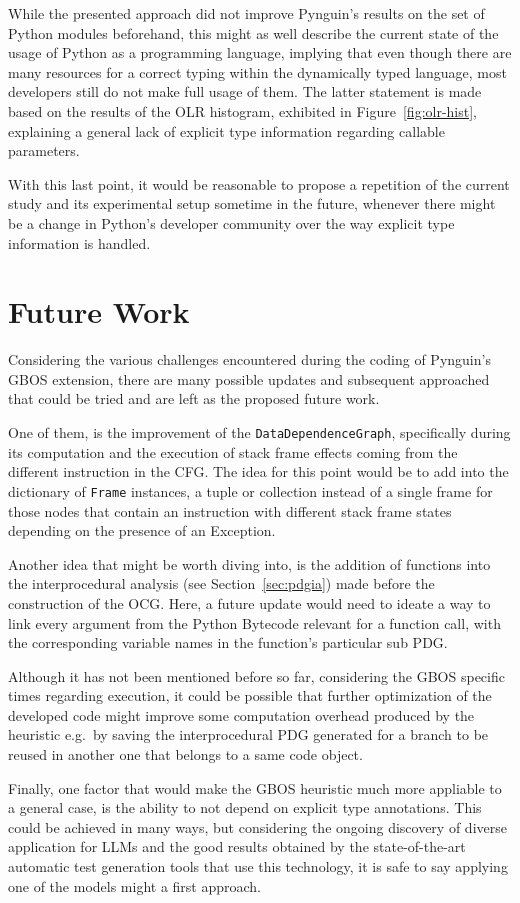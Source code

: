 \documentclass[%
  chapterprefix=false,%
  open=right,%
  twoside=true,%
  paper=a4,%
  logofile={Figures/logo.png},%
  thesistype=master,%
  UKenglish,%
]{se2thesis}
\newcommand{\classname}[1]{\texttt{#1}}
\begin{document}
While the presented approach did not improve Pynguin's results on the set of Python modules beforehand, this might as well describe the current state of the usage of Python as a programming language, implying that even though there are many resources for a correct typing within the dynamically typed language, most developers still do not make full usage of them.
The latter statement is made based on the results of the OLR histogram, exhibited in Figure~\ref{fig:olr-hist}, explaining a general lack of explicit type information regarding callable parameters.

With this last point, it would be reasonable to propose a repetition of the current study and its experimental setup sometime in the future, whenever there might be a change in Python's developer community over the way explicit type information is handled. 

\section{Future Work}

Considering the various challenges encountered during the coding of Pynguin's GBOS extension, there are many possible updates and subsequent approached that could be tried and are left as the proposed future work.

One of them, is the improvement of the \classname{DataDependenceGraph}, specifically during its computation and the execution of stack frame effects coming from the different instruction in the CFG.\@
The idea for this point would be to add into the dictionary of \classname{Frame} instances, a tuple or collection instead of a single frame for those nodes that contain an instruction with different stack frame states depending on the presence of an Exception.

Another idea that might be worth diving into, is the addition of functions into the interprocedural analysis (see Section~\ref{sec:pdgia}) made before the construction of the OCG.\@
Here, a future update would need to ideate a way to link every argument from the Python Bytecode relevant for a function call, with the corresponding variable names in the function's particular sub PDG.\@

Although it has not been mentioned before so far, considering the GBOS specific times regarding execution, it could be possible that further optimization of the developed code might improve some computation overhead produced by the heuristic e.g.~by saving the interprocedural PDG generated for a branch to be reused in another one that belongs to a same code object.

Finally, one factor that would make the GBOS heuristic much more appliable to a general case, is the ability to not depend on explicit type annotations.
This could be achieved in many ways, but considering the ongoing discovery of diverse application for LLMs and the good results obtained by the state-of-the-art automatic test generation tools that use this technology, it is safe to say applying one of the models might a first approach.

\backmatter{}

\printbibliography{}
\end{document}
